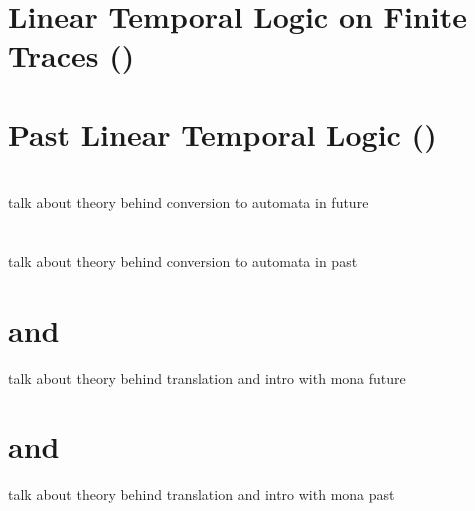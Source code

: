 \section{Linear Temporal Logic on Finite Traces (\LTLf)}
\section{Past Linear Temporal Logic (\PLTL)}
\section{\LTLfToDFA}
talk about theory behind conversion to automata in future
\section{\PLTLToDFA}
talk about theory behind conversion to automata in past
\section{\LTLfToFOL and \MONA}
talk about theory behind translation and intro with mona future
\section{\PLTLToFOL and \MONA}
talk about theory behind translation and intro with mona past
